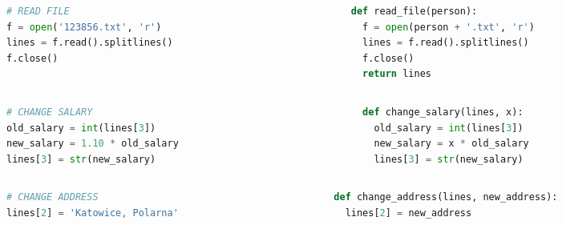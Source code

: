 \documentclass[aspectratio=169]{beamer}
\begin{document}
\begin{frame}[fragile]
\begin{columns}
\begin{column}{0.5\textwidth}
\begin{lstlisting}[basicstyle=\small,language=python]
# READ FILE
f = open('123856.txt', 'r')
lines = f.read().splitlines()
f.close()
\end{lstlisting}
\end{column}
\begin{column}{0.5\textwidth}
\begin{lstlisting}[basicstyle=\small,language=python]
def read_file(person):
  f = open(person + '.txt', 'r')
  lines = f.read().splitlines()
  f.close()
  return lines
\end{lstlisting}
\end{column}
\end{columns}
\end{frame}

\begin{frame}[fragile]
\begin{columns}
\begin{column}{0.5\textwidth}
\begin{lstlisting}[basicstyle=\small,language=python]
# CHANGE SALARY
old_salary = int(lines[3])
new_salary = 1.10 * old_salary
lines[3] = str(new_salary)
\end{lstlisting}
\end{column}
\begin{column}{0.5\textwidth}
\begin{lstlisting}[basicstyle=\small,language=python]
def change_salary(lines, x):
  old_salary = int(lines[3])
  new_salary = x * old_salary
  lines[3] = str(new_salary)
\end{lstlisting}
\end{column}
\end{columns}
\end{frame}

\begin{frame}[fragile]
\begin{columns}
\begin{column}{0.5\textwidth}
\begin{lstlisting}[basicstyle=\small,language=python]
# CHANGE ADDRESS
lines[2] = 'Katowice, Polarna'
\end{lstlisting}
\end{column}
\begin{column}{0.5\textwidth}
\begin{lstlisting}[basicstyle=\small,language=python]
def change_address(lines, new_address):
  lines[2] = new_address
\end{lstlisting}
\end{column}
\end{columns}
\end{frame}
\end{document}
